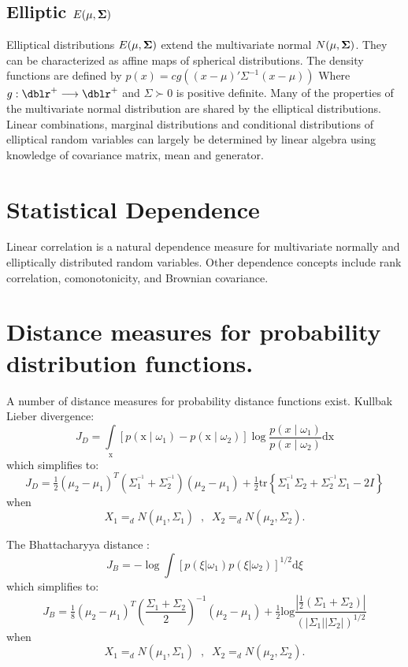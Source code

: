 \subsection{Elliptic $E(\mathbf{\mu},\mathbf{\Sigma})$}
Elliptical distributions $E(\mathbf{\mu},\mathbf{\Sigma})$ extend the multivariate normal $N(\mathbf{\mu},\mathbf{\Sigma})$.  They can be characterized as affine maps of spherical distributions. The density functions
are defined by $p(x) = c g(  (x-\mu)' \Sigma^{-1} (x-\mu) )$  Where $g : \dblr^{+} \longrightarrow \dblr^{+}$ and $ \Sigma \succ 0$ is positive definite.
Many of the properties of the multivariate normal distribution
are shared by the elliptical distributions. Linear combinations, marginal distributions and conditional distributions of elliptical random variables can largely be determined by linear algebra using knowledge of covariance
matrix, mean and generator.

\section*{Statistical Dependence}
Linear correlation is a natural dependence measure for
multivariate normally and elliptically distributed random variables.  Other dependence concepts include rank correlation, comonotonicity, and Brownian covariance.


\section*{Distance measures for probability distribution functions.}
A number of distance measures for probability distance
functions exist.  Kullbak Lieber divergence:\[ J_D  =
\int\limits_{\text{x}} {[p({\text{x}}\mid\omega_1 ) -
p({\text{x}}\mid\omega_2 )]}
     \log \frac{{p(x\mid\omega_1 )}} {{p(x\mid\omega_2 )}}{\text{dx}}\]
which simplifies to:\[ J_D  = \tfrac{1} {2}\left( {\mu _2  -
\mu _1 } \right)^T  \left( {\Sigma _1^{^{ - 1} }  + \Sigma
_2^{^{ - 1} } } \right)\left( {\mu _2  - \mu _1 } \right) +
\tfrac{1} {2}{\text{tr}}\left\{ {\Sigma _1^{^{ - 1} } \Sigma _2
+ \Sigma _2^{^{ - 1} } \Sigma _1  - 2I} \right\}\] when \[X_1
=_d N(\mu_1,\Sigma_1) \;\; , \;\; X_2 =_d N(\mu_2,\Sigma_2).\]

The Bhattacharyya distance :
\[J_B  =  - \log \int {\left[ {p(\xi \left| {\omega _1 }
\right.)p(\xi \left| {\omega _2 } \right.)} \right]} ^{{1/2}}
{\text{d}}\xi
\] which simplifies to: \[
J_B  = \tfrac{1} {8}\left( {\mu _2  - \mu _1 } \right)^T \left(
{\frac{{\Sigma _1  + \Sigma _2 }} {2}} \right)^{ - 1} \left(
{\mu _2  - \mu _1 } \right) + \tfrac{1}
{2}{\text{log}}\frac{{\left| {\tfrac{1} {2}(\Sigma _1  + \Sigma
_2 )} \right|}} {{( {\left| {\Sigma _1 } \right|\left| {\Sigma
_2 } \right|} )^{1/2} }}
\] when \[X_1 =_d  N(\mu_1,\Sigma_1) \;\; , \;\; X_2 =_d
N(\mu_2,\Sigma_2).\]


